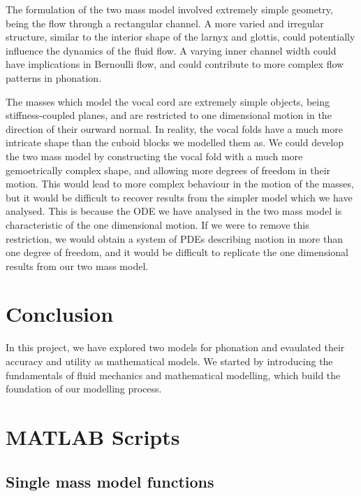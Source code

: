 \documentclass{report}
\begin{document}
The formulation of the two mass model involved extremely simple geometry,
being the flow through a rectangular channel.
A more varied and irregular structure,
similar to the interior shape of the larnyx and glottis,
could potentially influence the dynamics of the fluid flow.
A varying inner channel width could have implications in Bernoulli flow,
and could contribute to more complex flow patterns in phonation.

The masses which model the vocal cord are extremely simple objects,
being stiffness-coupled planes,
and are restricted to one dimensional motion in the direction of their ourward normal.
In reality, the vocal folds have a much more intricate shape than the cuboid blocks we modelled them as.
We could develop the two mass model by constructing the vocal fold with a much more gemoetrically complex shape,
and allowing more degrees of freedom in their motion.
This would lead to more complex behaviour in the motion of the masses,
but it would be difficult to recover results from the simpler model which we have analysed.
This is because the ODE we have analysed in the two mass model is characteristic of the one dimensional motion.
If we were to remove this restriction,
we would obtain a system of PDEs describing motion in more than one degree of freedom,
and it would be difficult to replicate the one dimensional results from our two mass model.


\chapter{Conclusion}

In this project,
we have explored two models for phonation and evaulated their accuracy and utility as mathematical models.
We started by introducing the fundamentals of fluid mechanics and mathematical modelling,
which build the foundation of our modelling process.






\appendix


\chapter{MATLAB Scripts}

\section{Single mass model functions}
\end{document}
